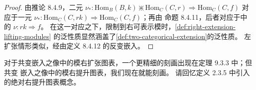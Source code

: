 \begin{proof}
由推论 8.4.9，二元\trCell{} $\nu_{*}\colon \mathrm{Hom}_{B}(B,k)\divideontimes\mathrm{Hom}_{C}(C,r)\Rightarrow \mathrm{Hom}_{C}(C,f)$ 对应于一元\trCell{}
$\nu_{*}\colon \mathrm{Hom}_{C}(C,rk)\Rightarrow \mathrm{Hom}_{C}(C,f)$；再由
命题 8.4.11，后者对应于\trHomotopyTwoCategory{}中的\trNaturalTransformation{}
$\nu\colon rk\Rightarrow f$。
在这一对应之下，限制到右可表示模时，\cref{def:right-extension-lifting-modules}
的泛性质显然涵盖了\cref{def:two-categorical-extension}的泛性质。
左扩张情形类似，经由定义 8.4.12 的反变嵌入。
\end{proof}

对于共变嵌入之像中的模右扩张图表，一个更精细的刻画出现在定理 9.3.3 中；但共变
嵌入之像中的模右提升图表，我们现在就能刻画。
请回忆定义 2.3.5 中引入的绝对右提升图表概念。

